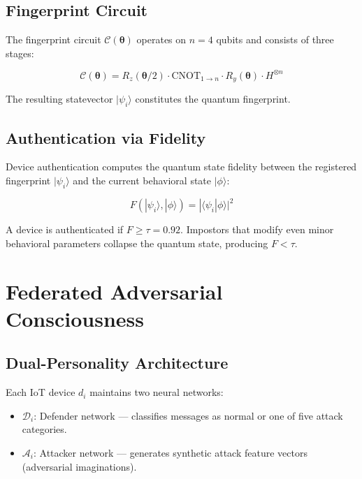 \documentclass[journal]{IEEEtran}
\begin{document}
\subsection{Fingerprint Circuit}
The fingerprint circuit $\mathcal{C}(\boldsymbol{\theta})$ operates on
$n=4$ qubits and consists of three stages:

\begin{equation}
\mathcal{C}(\boldsymbol{\theta}) = R_z(\boldsymbol{\theta}/2) \cdot
\text{CNOT}_{1\rightarrow n} \cdot R_y(\boldsymbol{\theta}) \cdot H^{\otimes n}
\end{equation}

The resulting statevector $|\psi_i\rangle$ constitutes the quantum fingerprint.

\subsection{Authentication via Fidelity}
Device authentication computes the quantum state fidelity between the
registered fingerprint $|\psi_i\rangle$ and the current behavioral state
$|\phi\rangle$:

\begin{equation}
F(|\psi_i\rangle, |\phi\rangle) = |\langle\psi_i|\phi\rangle|^2
\end{equation}

A device is authenticated if $F \geq \tau = 0.92$. Impostors that
modify even minor behavioral parameters collapse the quantum state,
producing $F < \tau$.


\section{Federated Adversarial Consciousness}
\label{sec:fac}

\subsection{Dual-Personality Architecture}
Each IoT device $d_i$ maintains two neural networks:
\begin{itemize}
  \item $\mathcal{D}_i$: Defender network — classifies messages as normal
        or one of five attack categories.
  \item $\mathcal{A}_i$: Attacker network — generates synthetic attack
        feature vectors (adversarial imaginations).
\end{itemize}
\end{document}
